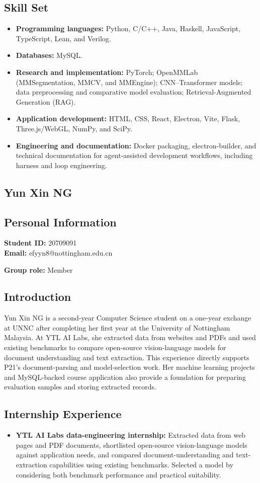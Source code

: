 \documentclass[a4paper,12pt]{article}
\newcommand{\PersonalInformation}[2]{%
  \subsection*{Personal Information}
  \if\relax\detokenize{#1}\relax\else
  \noindent\textbf{Student ID:} #1\\
  \fi
  \textbf{Email:} #2\par
}
\begin{document}
\subsection*{Skill Set}
\begin{itemize}
  \item \textbf{Programming languages:} Python, C/C++, Java, Haskell, JavaScript, TypeScript, Lean, and Verilog.
  \item \textbf{Databases:} MySQL.
  \item \textbf{Research and implementation:} PyTorch; OpenMMLab (MMSegmentation, MMCV, and MMEngine); CNN--Transformer models; data preprocessing and comparative model evaluation; Retrieval-Augmented Generation (RAG).
  \item \textbf{Application development:} HTML, CSS, React, Electron, Vite, Flask, Three.js/WebGL, NumPy, and SciPy.
  \item \textbf{Engineering and documentation:} Docker packaging, electron-builder, and technical documentation for agent-assisted development workflows, including harness and loop engineering.
\end{itemize}

\subsection{Yun Xin NG}
\PersonalInformation{20709091}{efyyn8@nottingham.edu.cn}
\noindent\textbf{Group role:} Member\par

\subsection*{Introduction}
Yun Xin NG is a second-year Computer Science student on a one-year exchange at UNNC after completing her first year at the University of Nottingham Malaysia. At YTL AI Labs, she extracted data from websites and PDFs and used existing benchmarks to compare open-source vision-language models for document understanding and text extraction. This experience directly supports P21's document-parsing and model-selection work. Her machine learning projects and MySQL-backed course application also provide a foundation for preparing evaluation samples and storing extracted records.

\subsection*{Internship Experience}
\begin{itemize}
  \item \textbf{YTL AI Labs data-engineering internship:} Extracted data from web pages and PDF documents, shortlisted open-source vision-language models against application needs, and compared document-understanding and text-extraction capabilities using existing benchmarks. Selected a model by considering both benchmark performance and practical suitability.
\end{itemize}
\end{document}
